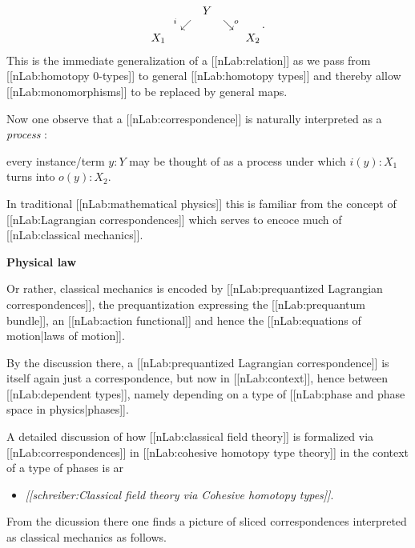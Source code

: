 \documentclass[12pt,titlepage]{article}
\def\mathllap{\mathpalette\mathllapinternal}
\def\mathrlap{\mathpalette\mathrlapinternal}
\def\mathllapinternal#1#2{\llap{$\mathsurround=0pt#1{#2}$}}
\def\mathrlapinternal#1#2{\rlap{$\mathsurround=0pt#1{#2}$}}
\newcommand{\itexarray}[1]{\begin{matrix}#1\end{matrix}}
\theoremstyle{plain}
\theoremstyle{definition}
\theoremstyle{remark}
\begin{document}
\begin{displaymath}
\itexarray{
    && Y
    \\
    & {}^{\mathllap{i}}\swarrow && \searrow^{\mathrlap{o}}
    \\
    X_1 && && X_2
  }
  \,.
\end{displaymath}
This is the immediate generalization of a [[nLab:relation]] as we pass from [[nLab:homotopy 0-types]] to general [[nLab:homotopy types]] and thereby allow [[nLab:monomorphisms]] to be replaced by general maps.

Now one observe that a [[nLab:correspondence]] is naturally interpreted as a \emph{process} :

every instance/term $y\colon Y$ may be thought of as a process under which $i(y) \colon X_1$ turns into $o(y) \colon X_2$.

In traditional [[nLab:mathematical physics]] this is familiar from the concept of [[nLab:Lagrangian correspondences]] which serves to encoce much of [[nLab:classical mechanics]].

\textbf{Physical law}

Or rather, classical mechanics is encoded by [[nLab:prequantized Lagrangian correspondences]], the prequantization expressing the [[nLab:prequantum bundle]], an [[nLab:action functional]] and hence the [[nLab:equations of motion|laws of motion]].

By the discussion there, a [[nLab:prequantized Lagrangian correspondence]] is itself again just a correspondence, but now in [[nLab:context]], hence between [[nLab:dependent types]], namely depending on a type of [[nLab:phase and phase space in physics|phases]].

A detailed discussion of how [[nLab:classical field theory]] is formalized via [[nLab:correspondences]] in [[nLab:cohesive homotopy type theory]] in the context of a type of phases is ar

\begin{itemize}%
\item \emph{[[schreiber:Classical field theory via Cohesive homotopy types]]}.

\end{itemize}
From the dicussion there one finds a picture of sliced correspondences interpreted as classical mechanics as follows.
\end{document}
